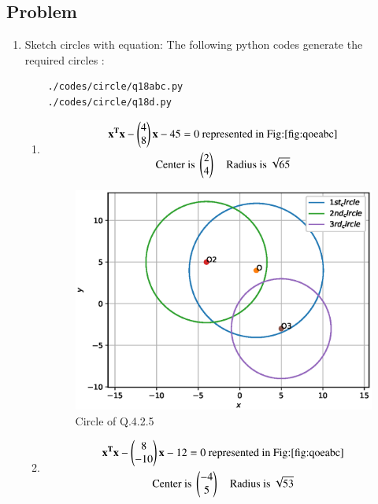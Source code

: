 \subsection{Problem}

\renewcommand{\theequation}{\theenumi}
\begin{enumerate}[label=\thesection.\arabic*.,ref=\thesection.\theenumi]
\item Sketch circles with equation:
The following python codes generate the required circles :
	\begin{lstlisting}
	./codes/circle/q18abc.py
	./codes/circle/q18d.py
	\end{lstlisting}


\begin{enumerate}

\item \begin{multline} 
\mathbf{x^Tx} - \begin{pmatrix}4\\8\end{pmatrix}\mathbf{x} -45 = 0\text{ represented in Fig:\ref{fig:qoeabc}}
\\
\text{Center is }\begin{pmatrix}2\\4\end{pmatrix}\quad\text{Radius is }\sqrt{65}
\end{multline}

	\begin{figure}[!ht]
	\centering
	\includegraphics[width=\columnwidth]{./figs/circle/q18abc.eps}
	\caption{Circle of Q.4.2.5}
	\label{fig:qoeabc}	
	\end{figure}

\item \begin{multline} 
\mathbf{x^Tx} - \begin{pmatrix}8\\-10\end{pmatrix}\mathbf{x} - 12 = 0\text{ represented in Fig:\ref{fig:qoeabc}}
\\
\text{Center is }\begin{pmatrix}-4\\5\end{pmatrix}\quad\text{Radius is }\sqrt{53}
\end{multline}



\end{enumerate}
\end{enumerate}
